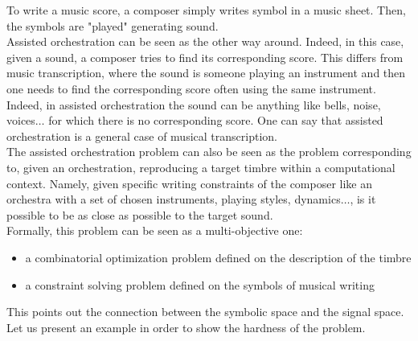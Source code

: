 \documentclass[a4paper]{book}
\begin{document}
To write a music score, a composer simply writes symbol in a music sheet. Then, the symbols are "played" generating sound. \\
Assisted orchestration can be seen as the other way around. Indeed, in this case, given a sound, a composer tries to find its corresponding score. This differs from music transcription, where the sound is someone playing an instrument and then one needs to find the corresponding score often using the same instrument. Indeed, in assisted orchestration the sound can be anything like bells, noise, voices$\ldots$ for which there is no corresponding score. One can say that assisted orchestration is a general case of musical transcription. \\

The assisted orchestration problem can also be seen as the problem corresponding to, given an orchestration, reproducing a target timbre within a computational context. Namely, given specific writing constraints of the composer like an orchestra with a set of chosen instruments, playing styles, dynamics$\ldots$, is it possible to be as close as possible to the target sound. \\

Formally, this problem can be seen as a multi-objective one:
\begin{itemize}
    \item a combinatorial optimization problem defined on the description of the timbre
    \item a constraint solving problem defined on the symbols of musical writing
\end{itemize}
This points out the connection between the symbolic space and the signal space.\\

Let us present an example in order to show the hardness of the problem.
\end{document}
